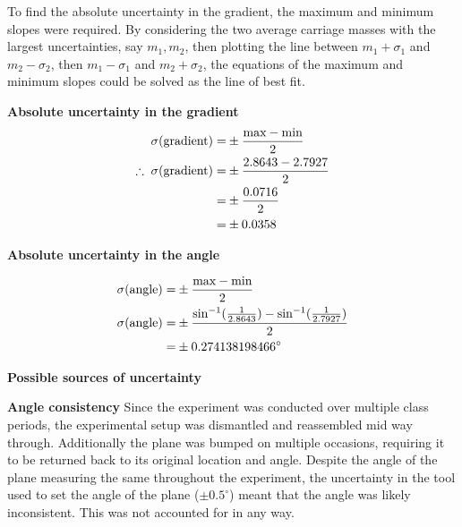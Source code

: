 \documentclass[11pt,a4paper]{article}
\begin{document}
To find the absolute uncertainty in the gradient, the maximum and minimum slopes were required. By considering the two average carriage masses with the largest uncertainties, say $m_1, m_2$, then plotting the line between $m_1+\sigma_1$ and $m_2-\sigma_2$, then  $m_1-\sigma_1$ and $m_2+\sigma_2$, the equations of the maximum and minimum slopes could be solved as the line of best fit.
\begin{center}
	\textbf{Absolute uncertainty in the gradient}
	\begin{align*}
		\centering
		\sigma(\textrm{gradient})=&\pm\frac{\textrm{max}-\textrm{min}}{2}\\
		\therefore\;\sigma(\textrm{gradient})=&\pm\frac{2.8643-2.7927}{2}\\
		=&\pm\frac{0.0716}{2}\\
		=&\pm0.0358
	\end{align*}
	
	\textbf{Absolute uncertainty in the angle}
	
	\begin{align*}
		\centering
		\sigma(\textrm{angle})=&\pm\frac{\textrm{max}-\textrm{min}}{2}\\
		\sigma(\textrm{angle})=&\pm\frac{\sin^{-1}(\frac{1}{2.8643})-\sin^{-1}(\frac{1}{2.7927})}{2}\\
		=&\pm0.274138198466^\circ 
	\end{align*}
	
\end{center}
\hfill

{\large \textbf{Possible sources of uncertainty}}



\textbf{Angle consistency}\newline
Since the experiment was conducted over multiple class periods, the experimental setup was dismantled and reassembled mid way through. Additionally the plane was bumped on multiple occasions, requiring it to be returned back to its original location and angle. Despite the angle of the plane measuring the same throughout the experiment, the uncertainty in the tool used to set the angle of the plane ($\pm0.5^\circ$) meant that the angle was likely inconsistent. This was not accounted for in any way.
\end{document}
